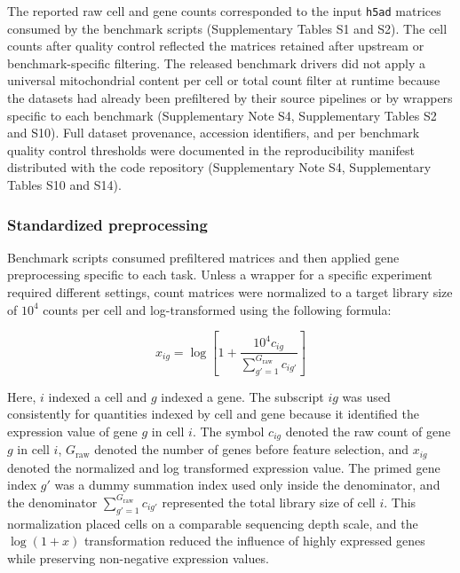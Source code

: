 \documentclass[11pt]{article}
\begin{document}
The reported raw cell and gene counts corresponded to the input \texttt{h5ad} matrices consumed by the benchmark scripts (Supplementary Tables S1 and S2). The cell counts after quality control reflected the matrices retained after upstream or benchmark-specific filtering. The released benchmark drivers did not apply a universal mitochondrial content per cell or total count filter at runtime because the datasets had already been prefiltered by their source pipelines or by wrappers specific to each benchmark (Supplementary Note S4, Supplementary Tables S2 and S10). Full dataset provenance, accession identifiers, and per benchmark quality control thresholds were documented in the reproducibility manifest distributed with the code repository (Supplementary Note S4, Supplementary Tables S10 and S14).

\subsubsection*{Standardized preprocessing}

Benchmark scripts consumed prefiltered matrices and then applied gene preprocessing specific to each task. Unless a wrapper for a specific experiment required different settings, count matrices were normalized to a target library size of $10^{4}$ counts per cell and log-transformed using the following formula:

\begin{equation}
x_{ig}=
\log\left[
1+
\frac{10^{4}c_{ig}}
{\sum_{g'=1}^{G_{\mathrm{raw}}}c_{ig'}}
\right]
  \label{eq:preprocess}
\end{equation}

Here, $i$ indexed a cell and $g$ indexed a gene. The subscript $ig$ was used consistently for quantities indexed by cell and gene because it identified the expression value of gene $g$ in cell $i$. The symbol $c_{ig}$ denoted the raw count of gene $g$ in cell $i$, $G_{\mathrm{raw}}$ denoted the number of genes before feature selection, and $x_{ig}$ denoted the normalized and log transformed expression value. The primed gene index $g'$ was a dummy summation index used only inside the denominator, and the denominator $\sum_{g'=1}^{G_{\mathrm{raw}}}c_{ig'}$ represented the total library size of cell $i$. This normalization placed cells on a comparable sequencing depth scale, and the $\log(1+x)$ transformation reduced the influence of highly expressed genes while preserving non-negative expression values.
\end{document}
